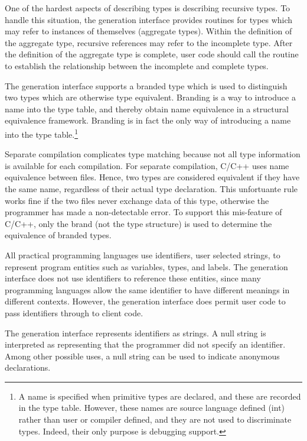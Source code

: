 One of the hardest aspects of describing types is describing recursive
types.  To handle this situation, the generation interface provides
 routines for types which may refer to instances
of themselves (\ie aggregate types).  Within the definition of the
aggregate type, recursive references may refer to the incomplete type.
After the definition of the aggregate type is complete, user code
should call the  routine to establish the
relationship between the incomplete and complete types.

The generation interface supports a branded type which is used to
distinguish two types which are otherwise type equivalent.  Branding
is a way to introduce a name into the type table, and thereby obtain
name equivalence in a structural equivalence framework.  Branding is
in fact the only way of introducing a name into the type 
table.\footnote{A name is specified when primitive types are declared,
and these are recorded in the type table.  However, these names are
source language defined (\eg int) rather than user or compiler defined,
and they are not used to discriminate types.  Indeed, their only
purpose is debugging support.}

Separate compilation complicates type matching because not all type
information is available for each compilation.  For separate
compilation, C/C++ uses name equivalence between files.  Hence, two
types are considered equivalent if they have the same name, regardless
of their actual type declaration.  This unfortuante rule works fine if
the two files never exchange data of this type, otherwise the
programmer has made a non-detectable error.  To support this
mis-feature of C/C++, only the brand (not the type structure) is used
to determine the equivalence of branded types.

\label{sec:identifiers}

All practical programming languages use identifiers, user selected
strings, to represent program entities such as variables, types, and
labels.  The generation interface does not use identifiers to
reference these entities, since many programming languages allow the
same identifier to have different meanings in different contexts.
However, the generation interface does permit user code to pass
identifiers through to client code.

The generation interface represents identifiers as strings.  A null
string is interpreted as representing that the programmer did not
specify an identifier.  Among other possible uses, a null string can
be used to indicate anonymous declarations.

